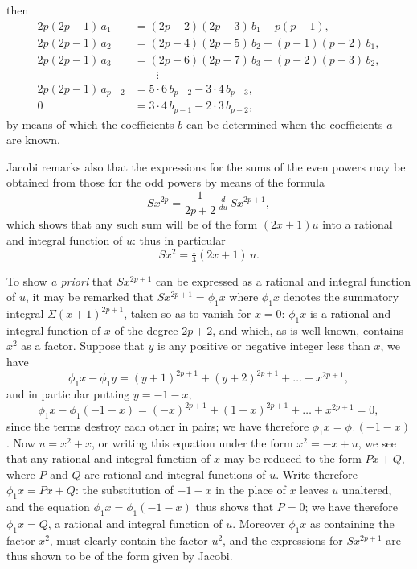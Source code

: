 \documentclass[11pt]{article}
\begin{document}
\noindent then
\begin{align*}
2p(2p-1)\,a_{1} &= (2p-2)(2p-3)\,b_{1} - p(p-1), \\
2p(2p-1)\,a_{2} &= (2p-4)(2p-5)\,b_{2} - (p-1)(p-2)\,b_{1}, \\
2p(2p-1)\,a_{3} &= (2p-6)(2p-7)\,b_{3} - (p-2)(p-3)\,b_{2}, \\
&\hspace{2em} \vdots \\
2p(2p-1)\,a_{p-2} &= 5\cdot 6\,b_{p-2} - 3\cdot 4\,b_{p-3}, \\
0 &= 3\cdot 4\,b_{p-1} - 2\cdot 3\,b_{p-2},
\end{align*}
by means of which the coefficients $b$ can be determined when the coefficients $a$ are known.

Jacobi remarks also that the expressions for the sums of the even powers may be obtained from those for the odd powers by means of the formula
\[
Sx^{2p} = \frac{1}{2p+2}\,\tfrac{d}{du}\,Sx^{2p+1},
\]
which shows that any such sum will be of the form $(2x+1)u$ into a rational and integral function of $u$: thus in particular
\[
Sx^{2} = \tfrac{1}{3}(2x+1)\,u.
\]

To show \emph{a priori} that $Sx^{2p+1}$ can be expressed as a rational and integral function of $u$, it may be remarked that $Sx^{2p+1} = \phi_{1}x$ where $\phi_{1}x$ denotes the summatory integral $\Sigma(x+1)^{2p+1}$, taken so as to vanish for $x = 0$: $\phi_{1}x$ is a rational and integral function of $x$ of the degree $2p+2$, and which, as is well known, contains $x^{2}$ as a factor. Suppose that $y$ is any positive or negative integer less than $x$, we have
\[
\phi_{1}x - \phi_{1}y = (y+1)^{2p+1} + (y+2)^{2p+1} + \ldots + x^{2p+1},
\]
and in particular putting $y = -1 - x$,
\[
\phi_{1}x - \phi_{1}(-1-x) = (-x)^{2p+1} + (1-x)^{2p+1} + \ldots + x^{2p+1} = 0,
\]
since the terms destroy each other in pairs; we have therefore $\phi_{1}x = \phi_{1}(-1-x)$. Now $u = x^{2} + x$, or writing this equation under the form $x^{2} = -x + u$, we see that any rational and integral function of $x$ may be reduced to the form $Px + Q$, where $P$ and $Q$ are rational and integral functions of $u$. Write therefore $\phi_{1}x = Px + Q$: the substitution of $-1-x$ in the place of $x$ leaves $u$ unaltered, and the equation $\phi_{1}x = \phi_{1}(-1-x)$ thus shows that $P = 0$; we have therefore $\phi_{1}x = Q$, a rational and integral function of $u$. Moreover $\phi_{1}x$ as containing the factor $x^{2}$, must clearly contain the factor $u^{2}$, and the expressions for $Sx^{2p+1}$ are thus shown to be of the form given by Jacobi.
\end{document}
